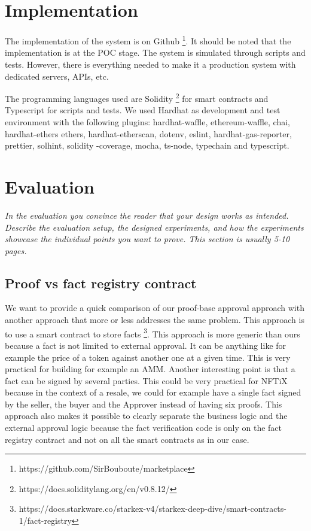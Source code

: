 \documentclass[a4paper,11pt,oneside]{report}
\begin{document}
\chapter{Implementation}
The implementation of the system is on Github \footnote{https://github.com/SirBouboute/marketplace}. It should be noted that the implementation is at the POC stage. The system is simulated through scripts and tests. However, there is everything needed to make it a production system with dedicated servers, APIs, etc.

The programming languages used are Solidity \footnote{https://docs.soliditylang.org/en/v0.8.12/} for smart contracts and Typescript for scripts and tests. We used Hardhat as development and test environment with the following plugins: hardhat-waffle, ethereum-waffle, chai, hardhat-ethers ethers, hardhat-etherscan, dotenv, eslint, hardhat-gas-reporter, prettier, solhint, solidity -coverage, mocha, ts-node, typechain and typescript.

\chapter{Evaluation}

\textit{In the evaluation you convince the reader that your design works as intended.
Describe the evaluation setup, the designed experiments, and how the
experiments showcase the individual points you want to prove.
This section is usually 5-10 pages.} \\

\section{Proof vs fact registry contract}
We want to provide a quick comparison of our proof-base approval approach with another approach that more or less addresses the same problem. This approach is to use a smart contract to store facts \footnote{https://docs.starkware.co/starkex-v4/starkex-deep-dive/smart-contracts-1/fact-registry}. This approach is more generic than ours because a fact is not limited to external approval. It can be anything like for example the price of a token against another one at a given time. This is very practical for building for example an AMM. Another interesting point is that a fact can be signed by several parties. This could be very practical for NFTiX because in the context of a resale, we could for example have a single fact signed by the seller, the buyer and the Approver instead of having six proofs. This approach also makes it possible to clearly separate the business logic and the external approval logic because the fact verification code is only on the fact registry contract and not on all the smart contracts as in our case.
\end{document}

